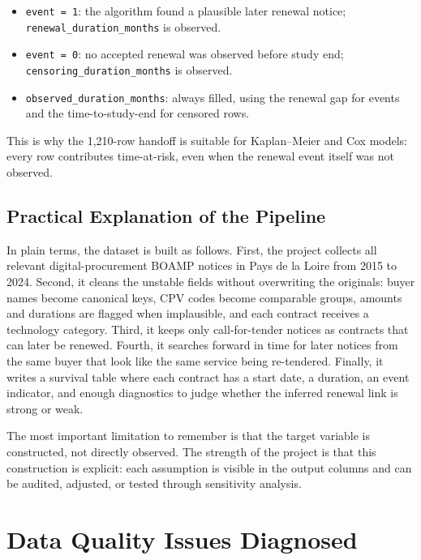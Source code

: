 \documentclass[12pt, a4paper]{article}
\begin{document}
\begin{itemize}
  \item \texttt{event = 1}: the algorithm found a plausible later renewal
        notice; \nolinkurl{renewal_duration_months} is observed.
  \item \texttt{event = 0}: no accepted renewal was observed before study end;
        \nolinkurl{censoring_duration_months} is observed.
  \item \nolinkurl{observed_duration_months}: always filled, using the renewal
        gap for events and the time-to-study-end for censored rows.
\end{itemize}

This is why the 1,210-row handoff is suitable for Kaplan--Meier and Cox models:
every row contributes time-at-risk, even when the renewal event itself was not
observed.

\subsection{Practical Explanation of the Pipeline}

In plain terms, the dataset is built as follows. First, the project collects all
relevant digital-procurement BOAMP notices in Pays de la Loire from 2015 to
2024. Second, it cleans the unstable fields without overwriting the originals:
buyer names become canonical keys, CPV codes become comparable groups, amounts
and durations are flagged when implausible, and each contract receives a
technology category. Third, it keeps only call-for-tender notices as contracts
that can later be renewed. Fourth, it searches forward in time for later notices
from the same buyer that look like the same service being re-tendered. Finally,
it writes a survival table where each contract has a start date, a duration, an
event indicator, and enough diagnostics to judge whether the inferred renewal
link is strong or weak.

The most important limitation to remember is that the target variable is
constructed, not directly observed. The strength of the project is that this
construction is explicit: each assumption is visible in the output columns and
can be audited, adjusted, or tested through sensitivity analysis.

\section{Data Quality Issues Diagnosed}
\end{document}
